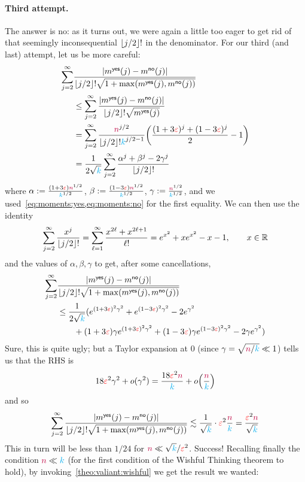 \paragraph{Third attempt.} The answer is no: as it turns out, we were again a little too eager to get rid of that seemingly inconsequential $\flr{j/2}!$ in the denominator. For our third (and last) attempt, let us be more careful:
\begin{align*}
\sum_{j=2}^\infty &\frac{\abs{m^{\yes}(j)-m^{\no}(j)}}{\flr{j/2}!\sqrt{1+\max(m^{\yes}(j),m^{\no}(j))}} \\
&\leq
\sum_{j=2}^\infty \frac{\abs{m^{\yes}(j)-m^{\no}(j)}}{\flr{j/2}!\sqrt{m^{\yes}(j)}}\\
&= \sum_{j=2}^\infty \frac{\ns^{j/2}}{\flr{j/2}!\ab^{{j/2}-1}}\Paren{ \frac{(1+3\dst)^j + (1-3\dst)^j}{2} - 1 } \\
&= \frac{1}{2\sqrt{\ab}}\sum_{j=2}^\infty \frac{\alpha^j+\beta^j-2\gamma^j}{\flr{j/2}!}
\end{align*}
where $\alpha := \frac{(1+3\textcolor{red}{\varepsilon}){\textcolor{purple}{n}}^{1/2}}{{\textcolor{cyan}{k}}^{1/2}}$, $\beta := \frac{(1-3\textcolor{red}{\varepsilon}){\textcolor{purple}{n}}^{1/2}}{{\textcolor{cyan}{k}}^{1/2}}$, $\gamma := \frac{{\textcolor{purple}{n}}^{1/2}}{{\textcolor{cyan}{k}}^{1/2}}$, and we used~\cref{eq:moments:yes,eq:moments:no} for the first equality. We can then use the identity
\[
	\sum_{j=2}^\infty \frac{x^j}{\flr{j/2}!}
	= \sum_{\ell=1}^\infty \frac{x^{2\ell}+x^{2\ell+1}}{\ell!}
	= e^{x^2} + x e^{x^2} - x - 1, \qquad x\in\R
\]
and the values of $\alpha,\beta,\gamma$ to get, after some cancellations,
\begin{align*}
\sum_{j=2}^\infty &\frac{\abs{m^{\yes}(j)-m^{\no}(j)}}{\flr{j/2}!\sqrt{1+\max(m^{\yes}(j),m^{\no}(j))}} \\
&\leq \frac{1}{2\sqrt{\ab}}( e^{(1+3\dst)^2\gamma^2}+e^{(1-3\dst)^2\gamma^2}-2e^{\gamma^2}
\\
&\qquad+ (1+3\dst)\gamma e^{(1+3\dst)^2\gamma^2}+(1-3\dst)\gamma e^{(1-3\dst)^2\gamma^2}-2\gamma e^{\gamma^2} )
\end{align*}
Sure, this is quite ugly; but a Taylor expansion at $0$ (since $\gamma = \sqrt{{\textcolor{purple}{n}}/{\textcolor{cyan}{k}}} \ll 1$) tells us that the RHS
is
\[
	18\dst^2 \gamma^2 + o(\gamma^2) = \frac{18\dst^2\ns}{\ab} + \littleO{\frac{\ns}{\ab}}
\]
and so 
\begin{equation}
	\sum_{j=2}^\infty \frac{\abs{m^{\yes}(j)-m^{\no}(j)}}{\flr{j/2}!\sqrt{1+\max(m^{\yes}(j),m^{\no}(j))}}
	\lesssim \frac{1}{\sqrt{\ab}} \cdot \dst^2\frac{\ns}{\ab} = \frac{\dst^2\ns}{\sqrt{\ab}}
\end{equation}
This in turn will be less than $1/24$ for ${\textcolor{purple}{n}} \ll \sqrt{{\textcolor{cyan}{k}}}/\textcolor{red}{\varepsilon}^2$. Success! Recalling finally the condition ${\textcolor{purple}{n}} \ll {\textcolor{cyan}{k}}$ (for the first condition of the Wishful Thinking theorem to hold), by invoking~\cref{theo:valiant:wishful} we get the result we wanted:
